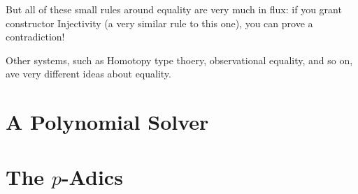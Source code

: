 \documentclass[usenames,dvipsnames]{beamer}
\begin{document}
\begin{frame}
{    But all of these small rules around equality are very much in flux: if you
    grant constructor Injectivity (a very similar rule to this one), you can
    prove a contradiction!

    Other systems, such as Homotopy type thoery, observational equality, and so
    on, ave very different ideas about equality. 
  }
\end{frame}
\section{A Polynomial Solver}
\section{The \(p\)-Adics}
\end{document}
